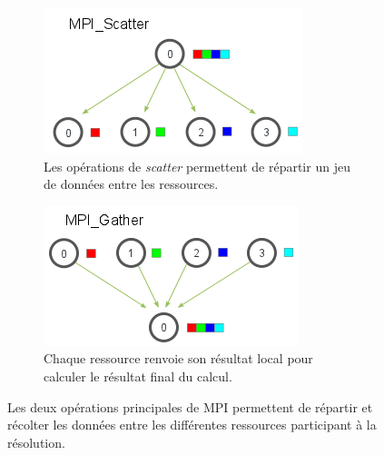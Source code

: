         
            \begin{figure}[t!]
                \centering
                \begin{subfigure}[t]{0.48\textwidth}
                    \centering
                    \includegraphics[width=.8\linewidth]{images/scatter.png}
                    \caption{\label{fig:scatter}Les opérations de \textit{scatter} permettent de répartir un jeu de données entre les ressources.}
                \end{subfigure}\hfill
            \begin{subfigure}[t]{0.48\textwidth}
                    \centering
                    \includegraphics[width=.8\linewidth]{images/gather.png}
                    \caption{\label{fig:gather}Chaque ressource renvoie son résultat local pour calculer le résultat final du calcul.}
                \end{subfigure}
                \caption{\label{fig:scatter_gather}Les deux opérations principales de MPI permettent de répartir et récolter les données entre les différentes ressources participant à la résolution\protect\footnotemark.}
            \end{figure}
               
               
           

